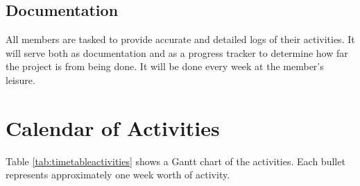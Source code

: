 \subsection{Documentation}
All members are tasked to provide accurate and detailed logs of their activities. It will serve both as documentation and as a progress tracker to determine how far the project is from being done. It will be done every week at the member’s leisure.


\section{Calendar of Activities}

	Table \ref{tab:timetableactivities} shows a Gantt chart of the activities.  Each bullet represents approximately
	one week worth of activity.
	
	\newcommand{\weekone}{\textbullet}
	\newcommand{\weektwo}{\textbullet \textbullet}
	\newcommand{\weekthree}{\textbullet \textbullet \textbullet}
	\newcommand{\weekfour}{\textbullet \textbullet \textbullet \textbullet}
	
